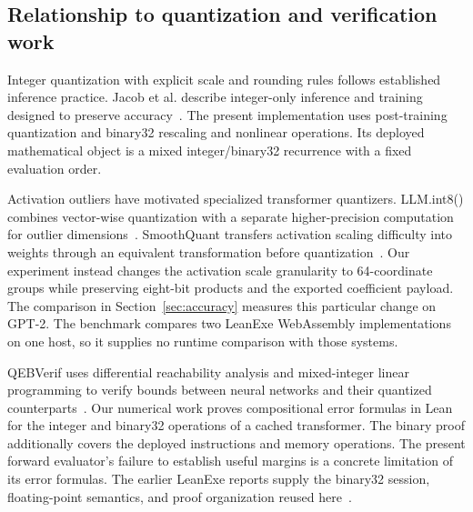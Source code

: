 \subsection{Relationship to quantization and verification work}

Integer quantization with explicit scale and rounding rules follows established inference practice.  Jacob et al. describe integer-only inference and training designed to preserve accuracy~\cite{jacob}.  The present implementation uses post-training quantization and binary32 rescaling and nonlinear operations.  Its deployed mathematical object is a mixed integer/binary32 recurrence with a fixed evaluation order.

Activation outliers have motivated specialized transformer quantizers.  LLM.int8() combines vector-wise quantization with a separate higher-precision computation for outlier dimensions~\cite{llmint8}.  SmoothQuant transfers activation scaling difficulty into weights through an equivalent transformation before quantization~\cite{smoothquant}.  Our experiment instead changes the activation scale granularity to 64-coordinate groups while preserving eight-bit products and the exported coefficient payload.  The comparison in Section~\ref{sec:accuracy} measures this particular change on GPT-2.  The benchmark compares two LeanExe WebAssembly implementations on one host, so it supplies no runtime comparison with those systems.

QEBVerif uses differential reachability analysis and mixed-integer linear programming to verify bounds between neural networks and their quantized counterparts~\cite{qebverif}.  Our numerical work proves compositional error formulas in Lean for the integer and binary32 operations of a cached transformer.  The binary proof additionally covers the deployed instructions and memory operations.  The present forward evaluator's failure to establish useful margins is a concrete limitation of its error formulas.  The earlier LeanExe reports supply the binary32 session, floating-point semantics, and proof organization reused here~\cite{fp32report,comprehensivereport}.
